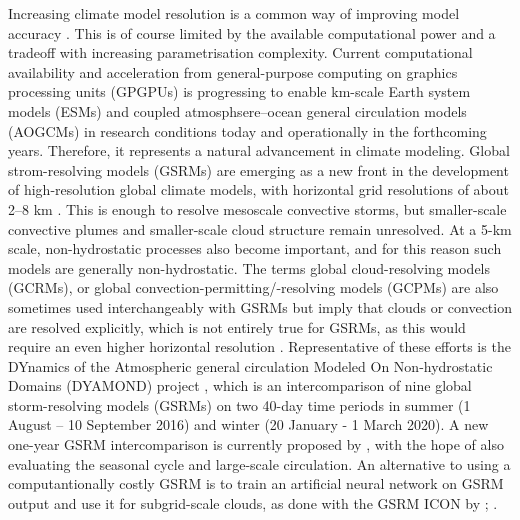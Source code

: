 \documentclass[12pt,a4paper]{article}
\begin{document}
Increasing climate model resolution is a common way of improving model accuracy
\citep{mauritsen2022}. This is of course limited by the available computational
power and a tradeoff with increasing parametrisation complexity.  Current
computational availability and acceleration from general-purpose computing on
graphics processing units (GPGPUs) is progressing to enable km-scale Earth
system models (ESMs) and coupled atmosphsere--ocean general circulation models
(AOGCMs) in research conditions today and operationally in the forthcoming
years. Therefore, it represents a natural advancement in climate modeling.
Global strom-resolving models (GSRMs) are emerging as a new front in the
development of high-resolution global climate models, with horizontal grid
resolutions of about 2--8 km \citep{satoh2019,stevens2019}. This is enough to
resolve mesoscale convective storms, but smaller-scale convective plumes and
smaller-scale cloud structure remain unresolved. At a 5-km scale,
non-hydrostatic processes also become important, and for this reason such
models are generally non-hydrostatic. The terms global cloud-resolving models
(GCRMs), or global convection-permitting/-resolving models (GCPMs) are also
sometimes used interchangeably with GSRMs but imply that clouds or convection
are resolved explicitly, which is not entirely true for GSRMs, as this would
require an even higher horizontal resolution \citep{satoh2019}.  Representative
of these efforts is the DYnamics of the Atmospheric general circulation Modeled
On Non-hydrostatic Domains (DYAMOND) project \citep{stevens2019,dyamond}, which
is an intercomparison of nine global storm-resolving models (GSRMs) on two
40-day time periods in summer (1 August -- 10 September 2016) and winter (20
January - 1 March 2020). A new one-year GSRM intercomparison is currently
proposed by \cite{takasuka2024}, with the hope of also evaluating the seasonal
cycle and large-scale circulation.  An alternative to using a computantionally
costly GSRM is to train an artificial neural network on GSRM output and use it
for subgrid-scale clouds, as done with the GSRM ICON by \cite{grundner2022};
\cite{grundner2023}.
\end{document}
